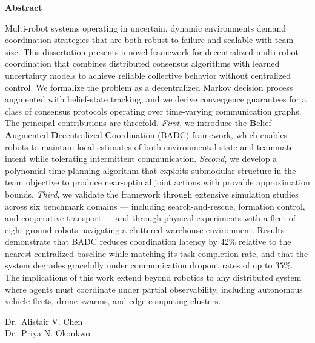 \documentclass[12pt,oneside]{report}
\theoremstyle{definition}
\theoremstyle{remark}
\begin{document}
\thispagestyle{empty}
{}
\begin{center}
  {\LARGE\bfseries\color{jhublue} Abstract}
\end{center}
\vspace{16pt}

Multi-robot systems operating in uncertain, dynamic environments demand coordination
strategies that are both robust to failure and scalable with team size. This dissertation
presents a novel framework for decentralized multi-robot coordination that combines
distributed consensus algorithms with learned uncertainty models to achieve reliable
collective behavior without centralized control. We formalize the problem as a
decentralized Markov decision process augmented with belief-state tracking,
and we derive convergence guarantees for a class of consensus protocols operating
over time-varying communication graphs. The principal contributions are threefold.
\textit{First}, we introduce the \textbf{B}elief-\textbf{A}ugmented \textbf{D}ecentralized
\textbf{C}oordination (BADC) framework, which enables robots to maintain local
estimates of both environmental state and teammate intent while tolerating intermittent
communication. \textit{Second}, we develop a polynomial-time planning algorithm that
exploits submodular structure in the team objective to produce near-optimal joint
actions with provable approximation bounds. \textit{Third}, we validate the framework
through extensive simulation studies across six benchmark domains --- including
search-and-rescue, formation control, and cooperative transport --- and through physical
experiments with a fleet of eight ground robots navigating a cluttered warehouse
environment. Results demonstrate that BADC reduces coordination latency by
$42\%$ relative to the nearest centralized baseline while matching its task-completion
rate, and that the system degrades gracefully under communication dropout rates
of up to $35\%$. The implications of this work extend beyond robotics to any
distributed system where agents must coordinate under partial observability,
including autonomous vehicle fleets, drone swarms, and edge-computing clusters.

\vspace{28pt}

 \hspace{4pt} Dr.\ Alistair V. Chen\\
 \hspace{4pt} Dr.\ Priya N. Okonkwo
\end{document}
